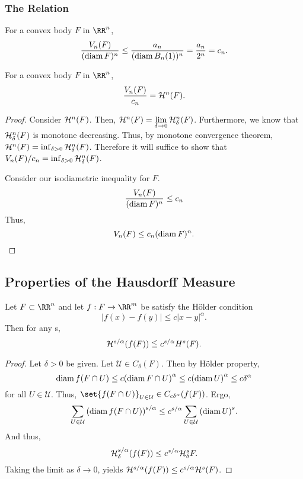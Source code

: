 \subsubsection{The Relation}

\begin{thm}
	For a convex body $F$ in $\RR^n$,
	\[
		\frac{V_n(F)}{(\operatorname{diam} F)^n} \leq \frac{a_n}{(\operatorname{diam} B_n(1))^n}=\frac{a_n}{2^n}=c_n.
	\]
\end{thm}

\begin{thm}
	For a convex body $F$ in $\RR^n$,
	\[
		\frac{V_n(F)}{c_n} = \mathcal{H}^n(F).
	\]
\end{thm}
\begin{proof}
	Consider $\mathcal{H}^n(F)$.
	Then, $\mathcal{H}^n (F) = \lim\limits_{\delta\rightarrow0} \mathcal{H}^n_\delta (F)$.
	Furthermore, we know that $\mathcal{H}^n_\delta(F)$ is monotone decreasing.
	Thus, by monotone convergence theorem, $\mathcal{H}^n(F)=\inf_{\delta>0} \mathcal{H}^n_\delta(F)$.
	Therefore it will suffice to show that $V_n(F)/c_n = \inf_{\delta>0} \mathcal{H}^n_\delta(F)$.

	Consider our isodiametric inequality for $F$.
	\[
		\frac{V_n(F)}{(\operatorname{diam} F)^n} \leq c_n
	\]
	Thus,
	\[
		V_n(F) \leq c_n(\operatorname{diam} F)^n.
	\]
\end{proof}

\subsection{Properties of the Hausdorff Measure}

\begin{thm}\label{hm-holder}
	Let $F\subset\RR^n$ and let $f: F\rightarrow\RR^m$ be satisfy the H\"older condition
	\[
		|f(x)-f(y)| \leq c|x-y|^\alpha.
	\]
	Then for any s,
	\[
		\mathcal{H}^{s/\alpha}(f(F))\leqq c^{s/\alpha}H^s(F).
	\]
\end{thm}
\begin{proof}
	Let $\delta>0$ be given.
	Let $\mathcal{U}\in C_\delta(F)$.
	Then by H\"older property,
	\[
		\operatorname{diam} f(F\cap U)\leq c{(\operatorname{diam} F\cap U)}^\alpha \leq c{(\operatorname{diam} U)}^\alpha\leq c\delta^\alpha
	\]
	for all $U\in\mathcal{U}$.
	Thus, $\set{f(F\cap U)}_{U\in\mathcal U}\in C_{c\delta^\alpha}(f(F))$.
	Ergo,
	\[
		\sum_{U\in\mathcal{U}} {(\operatorname{diam} f(F\cap U))}^{s/\alpha}\leq c^{s/\alpha}\sum_{U\in\mathcal{U}}{(\operatorname{diam} U)}^s.
	\]
	And thus,
	\[
		\mathcal{H}^{s/\alpha}_\delta (f(F)) \leq c^{s/\alpha}\mathcal{H}^s_\delta F.
	\]
	Taking the limit as $\delta\rightarrow 0$, yields $\mathcal{H}^{s/\alpha}(f(F))\leq c^{s/\alpha}\mathcal{H}^s(F)$.
\end{proof}

